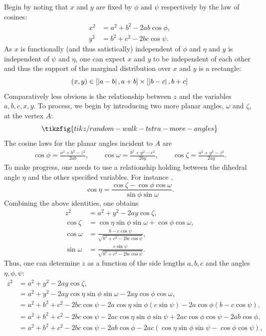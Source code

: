 \documentclass[notitlepage, 10pt]{article}
\begin{document}
Begin by noting that $x$ and $y$ are fixed by $\phi$ and $\psi$ respectively by the law of cosines:
\begin{align}
    x^2 &= a^2 + b^2 - 2ab \cos \phi, \\
    y^2 &= b^2 + c^2 - 2bc \cos \psi.
\end{align}
As $x$ is functionally (and thus satistically) independent of $\phi$ and $\eta$ and $y$ is independent of $\psi$ and $\eta$, one can expect $x$ and $y$ to be independent of each other and thus the support of the marginal distribution over $x$ and $y$ is a rectangle:
\begin{equation}
    (x,y) \in [\left|a-b\right|, a+b] \times [\left|b-c\right|, b+c]
\end{equation}
Comparatively less obvious is the relationship between $z$ and the variables $a,b,c,x,y$.
To process, we begin by introducing two more planar angles, $\omega$ and $\zeta$, at the vertex $A$:
\begin{equation}
    \tikzfig{tikz/random-walk-tetra-more-angles}
\end{equation}
The cosine laws for the planar angles incident to $A$ are
\begin{align}
    \cos \phi = \frac{a^2 + b^2 - z^2}{2ab}, \qquad
    \cos \omega = \frac{b^2 + y^2 - c^2}{2by}, \qquad
    \cos \zeta = \frac{a^2 + y^2 - z^2}{2ay}.
\end{align}
To make progress, one needs to use a relationship holding between the dihedral angle $\eta$ and the other specified variables.
For instance \cite{richardson1902trigonometry},
\begin{equation}
    \cos \eta = \frac{\cos\zeta - \cos\phi \cos \omega}{\sin \phi \sin \omega}.
\end{equation}
Combining the above identities, one obtains
\begin{align}
    z^2 &= a^2 + y^2 - 2 a y\cos \zeta, \\
    \cos \zeta &= \cos \eta \sin \phi \sin \omega + \cos \phi \cos \omega, \\
    \cos \omega &= \frac{b - c \cos \psi}{\sqrt{b^2 + c^2 - 2bc \cos \psi}}, \\
    \sin \omega &= \frac{c \sin\psi}{\sqrt{b^2 + c^2 - 2bc \cos \psi}}.
\end{align}
Thus, one can determine $z$ as a function of the side lengths $a,b,c$ and the angles $\eta,\phi,\psi$:
\begin{align}
    z^2 
    &= a^2 + y^2 - 2 a y\cos \zeta, \\
    &= a^2 + y^2 - 2 a y\cos \eta \sin \phi \sin \omega - 2 a y \cos \phi \cos \omega, \\
    &= a^2 + b^2 + c^2 - 2bc \cos \psi - 2 a\cos \eta \sin \phi (c \sin \psi) - 2 a \cos \phi (b-c\cos\psi), \\
    &= a^2 + b^2 + c^2 - 2bc \cos \psi - 2 ac\cos \eta \sin \phi \sin \psi + 2 a c \cos \phi \cos\psi- 2 ab \cos \phi, \\
    &= a^2 + b^2 + c^2 - 2bc \cos \psi - 2 ab \cos \phi - 2 ac(\cos \eta \sin \phi \sin \psi -\cos \phi \cos\psi),
\end{align}
\end{document}
